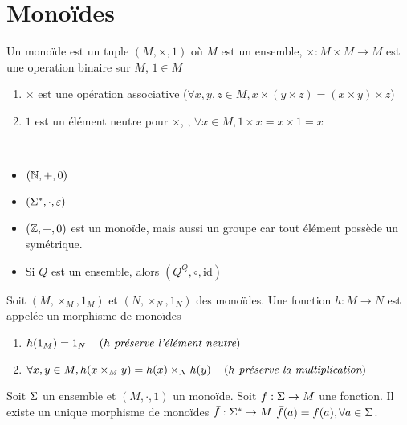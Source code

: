 \section{Monoïdes}

\begin{definition}[Monoïde]
	Un monoïde est un tuple $(M, \times, 1)$ où $M$ est un ensemble, $\times : M \times M \to M$ est une operation binaire sur $M$,
	$1\in M$ \tq
	\begin{enumerate}
		\item $\times$ est une opération  associative ($\forall x,y,z \in M , x \times (y \times z) = (x \times y) \times z$)
		\item $1$ est un élément neutre pour $\times$, \cad, $\forall x \in M, 1 \times x = x \times 1 = x$
	\end{enumerate}
\end{definition}

\begin{exemple}
	\ \newline
	\begin{itemize}
		\item $(\mathbb{N}, +, 0)$
		\item $(\Sigma^{*}, \cdot, \varepsilon)$
		\item $(\mathbb{Z}, +, 0)$ est un monoïde, mais aussi un groupe car tout élément possède un symétrique.
		\item Si $Q$ est un ensemble, alors $(Q ^ Q, \circ, \text{id})$
	\end{itemize}
\end{exemple}


\begin{definition}
	Soit $(M,\times_M, 1_M)$ et $(N,\times_N, 1_N)$ des monoïdes. Une fonction $h :  M \to N$ est appelée un morphisme de monoïdes \ssi
	\begin{enumerate}
		\item $h(1_M) = 1_N \quad\left(\textit{$h$ préserve l'élément neutre}\right)$
		\item $\forall x, y \in M, h (x \times_M y) = h(x) \times_N h(y) \quad\left(\textit{$h$ préserve la multiplication}\right)$
	\end{enumerate}
\end{definition}


\begin{prop}
	Soit $\Sigma$ un ensemble et $(M,\cdot, 1)$ un monoïde. Soit $f : \Sigma \to M$ une fonction. Il existe
	un unique morphisme de monoïdes $\bar f : \Sigma^{*} \to M$ \tq $\bar f (a) =  f (a),  \forall a \in \Sigma$.

\end{prop}


